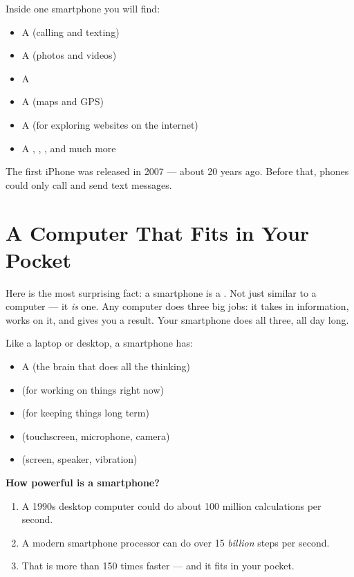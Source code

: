 Inside one smartphone you will find:
\begin{itemize}
  \item A  (calling and texting)
  \item A  (photos and videos)
  \item A 
  \item A  (maps and GPS)
  \item A  (for exploring websites on the internet)
  \item A , , , and much more
\end{itemize}

\begin{funfact}
  The first iPhone was released in 2007 — about 20 years ago.
  Before that, phones could only call and send text messages.
\end{funfact}

\sectionrule

\section*{A Computer That Fits in Your Pocket}

Here is the most surprising fact: a smartphone is a .
Not just similar to a computer — it \emph{is} one.
Any computer does three big jobs: it takes in information, works on it,
and gives you a result. Your smartphone does all three, all day long.

Like a laptop or desktop, a smartphone has:
\begin{itemize}
  \item A  (the brain that does all the thinking)
  \item {} (for working on things right now)
  \item {} (for keeping things long term)
  \item {} (touchscreen, microphone, camera)
  \item {} (screen, speaker, vibration)
\end{itemize}

\begin{quickmap}
  \textbf{How powerful is a smartphone?}
  \begin{enumerate}[label=\textbf{\arabic*.}]
    \item A 1990s desktop computer could do about 100 million calculations per second.
    \item A modern smartphone processor can do over 15 \emph{billion} steps per second.
    \item That is more than 150 times faster — and it fits in your pocket.
  \end{enumerate}
\end{quickmap}

